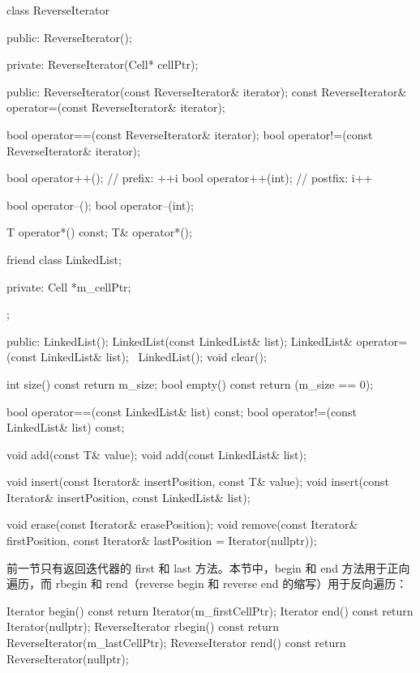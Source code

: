 \begin{codebox}
    class ReverseIterator {
      public:
        ReverseIterator();

      private:
        ReverseIterator(Cell* cellPtr);

      public:
        ReverseIterator(const ReverseIterator& iterator);
        const ReverseIterator&
              operator=(const ReverseIterator& iterator);

        bool operator==(const ReverseIterator& iterator);
        bool operator!=(const ReverseIterator& iterator);

        bool operator++();    // prefix: ++i
        bool operator++(int); // postfix: i++

        bool operator--();
        bool operator--(int);

        T operator*() const;
        T& operator*();

        friend class LinkedList;

      private:
        Cell *m_cellPtr;
  };

  public:
    LinkedList();
    LinkedList(const LinkedList& list);
    LinkedList& operator=(const LinkedList& list);
    ~LinkedList();
    void clear();

    int size() const {return m_size;}
    bool empty() const {return (m_size == 0);}

    bool operator==(const LinkedList& list) const;
    bool operator!=(const LinkedList& list) const;

    void add(const T& value);
    void add(const LinkedList& list);

    void insert(const Iterator& insertPosition, const T& value);
    void insert(const Iterator& insertPosition,
                const LinkedList& list);

    void erase(const Iterator& erasePosition);
    void remove(const Iterator& firstPosition,
                const Iterator& lastPosition = Iterator(nullptr));
\end{codebox}

前一节只有返回迭代器的 first 和 last 方法。本节中，begin 和 end 方法用于正向遍历，而 rbegin 和 rend（reverse begin 和 reverse end 的缩写）用于反向遍历：

\begin{codebox}
    Iterator begin() const { return Iterator(m_firstCellPtr); }
    Iterator end() const { return Iterator(nullptr); }
    ReverseIterator rbegin() const
      {return ReverseIterator(m_lastCellPtr);}
    ReverseIterator rend() const
      { return ReverseIterator(nullptr); }
\end{codebox}

